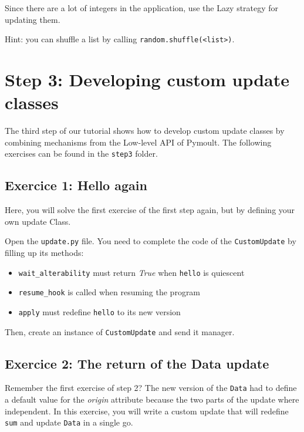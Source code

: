 \documentclass{article}
\begin{document}
Since there are a lot of integers in the application, use the Lazy
strategy for updating them.

Hint: you can shuffle a list by calling \texttt{random.shuffle(<list>)}.

\section{Step 3: Developing custom update classes}

The third step of our tutorial shows how to develop custom update
classes by combining mechanisms from the Low-level API of Pymoult. The
following exercises can be found in the \texttt{step3} folder.

\subsection{Exercice 1: Hello again}

Here, you will solve the first exercise of the first step again, but
by defining your own update Class. 

Open the \texttt{update.py} file. You need to complete the code of the
\texttt{CustomUpdate} by filling up its methods:

\begin{itemize}
\item \texttt{wait\_alterability} must return \textit{True} when
  \texttt{hello} is quiescent

\item \texttt{resume\_hook} is called when resuming the program

\item \texttt{apply} must redefine \texttt{hello} to its new version

\end{itemize}

Then, create an instance of \texttt{CustomUpdate} and send it manager.


\subsection{Exercice 2: The return of the Data update}

Remember the first exercise of step 2? The new version of the
\texttt{Data} had to define a default value for the \textit{origin}
attribute because the two parts of the update where independent. In
this exercise, you will write a custom update that will redefine
\texttt{sum} and update \texttt{Data} in a single go.
\end{document}
